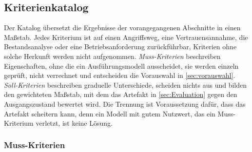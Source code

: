 \subsection{Kriterienkatalog}
\label{sec:kriterienkatalog}

Der Katalog übersetzt die Ergebnisse der vorangegangenen Abschnitte in einen Maßstab. Jedes Kriterium ist auf einen
Angriffsweg, eine Vertrauensannahme, die Bestandsanalyse oder eine Betriebsanforderung zurückführbar, Kriterien ohne
solche Herkunft werden nicht aufgenommen. \emph{Muss-Kriterien} beschreiben Eigenschaften, ohne die ein
Ausführungsmodell ausscheidet, sie werden einzeln geprüft, nicht verrechnet und entscheiden die Vorauswahl in
\autoref{sec:vorauswahl}. \emph{Soll-Kriterien} beschreiben graduelle Unterschiede, scheiden nichts aus und bilden den
gewichteten Maßstab, mit dem das Artefakt in \autoref{sec:Evaluation} gegen den Ausgangszustand bewertet wird. Die Trennung ist
Voraussetzung dafür, dass das Artefakt scheitern kann, denn ein Modell mit gutem Nutzwert, das ein Muss-Kriterium
verletzt, ist keine Lösung.

\subsubsection{Muss-Kriterien}

